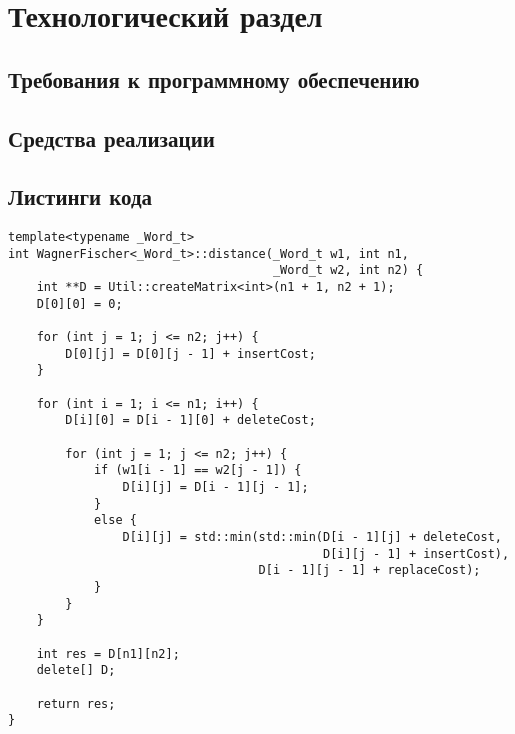 \chapter{Технологический раздел}
\label{cha:impl}

\section{Требования к программному обеспечению}

\section{Средства реализации}

\section{Листинги кода}

\noindent\begin{minipage}{\textwidth}
\begin{lstlisting}[caption=Расстояние Левенштейна (матричная реализация)]
template<typename _Word_t>
int WagnerFischer<_Word_t>::distance(_Word_t w1, int n1,
                                     _Word_t w2, int n2) {
    int **D = Util::createMatrix<int>(n1 + 1, n2 + 1);
    D[0][0] = 0;

    for (int j = 1; j <= n2; j++) {
        D[0][j] = D[0][j - 1] + insertCost;
    }

    for (int i = 1; i <= n1; i++) {
        D[i][0] = D[i - 1][0] + deleteCost;

        for (int j = 1; j <= n2; j++) {
            if (w1[i - 1] == w2[j - 1]) {
                D[i][j] = D[i - 1][j - 1];
            }
            else {
                D[i][j] = std::min(std::min(D[i - 1][j] + deleteCost,
                                            D[i][j - 1] + insertCost),
                                   D[i - 1][j - 1] + replaceCost);
            }
        }
    }

    int res = D[n1][n2];
    delete[] D;

    return res;
}
\end{lstlisting}
\end{minipage}

